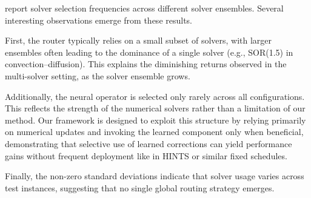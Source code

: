 \documentclass{article}
\begin{document}
\begin{table}[H]
\centering
\caption{
Average component selection frequencies for the Convection-Diffusion equation.
Rows indicate the router access set. Entries are mean ($\pm$ s.e.) over 128 test instances.
Here $\mathrm{NO}$ denotes the neural operator; ``-'' indicates that the component is not available to the router.
}
\label{tab:multsolverconvdiff}

\end{table}



 report solver selection frequencies across different solver ensembles. Several interesting observations emerge from these results. 

First, the router typically relies on a small subset of solvers, with larger ensembles often leading to the dominance of a single solver (e.g., SOR(1.5) in convection–diffusion). This explains the diminishing returns observed in the multi-solver setting, as the solver ensemble grows. 

Additionally, the neural operator is selected only rarely across all configurations. This reflects the strength of the numerical solvers rather than a limitation of our method. Our framework is designed to exploit this structure by relying primarily on numerical updates and invoking the learned component only when beneficial, demonstrating that selective use of learned corrections can yield performance gains without frequent deployment like in HINTS or similar fixed schedules.

Finally, the non-zero standard deviations indicate that solver usage varies across test instances, suggesting that no single global routing strategy emerges.
\end{document}
